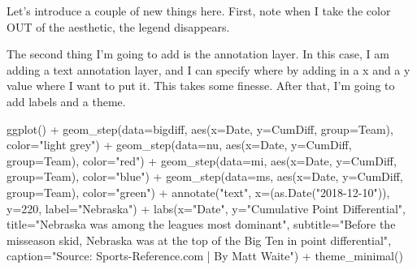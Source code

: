 \documentclass[
]{book}
\newenvironment{Shaded}{\begin{snugshade}}{\end{snugshade}}
\newcommand{\AttributeTok}[1]{\textcolor[rgb]{0.77,0.63,0.00}{#1}}
\newcommand{\DecValTok}[1]{\textcolor[rgb]{0.00,0.00,0.81}{#1}}
\newcommand{\FunctionTok}[1]{\textcolor[rgb]{0.00,0.00,0.00}{#1}}
\newcommand{\NormalTok}[1]{#1}
\newcommand{\SpecialCharTok}[1]{\textcolor[rgb]{0.00,0.00,0.00}{#1}}
\newcommand{\StringTok}[1]{\textcolor[rgb]{0.31,0.60,0.02}{#1}}
\begin{document}
Let's introduce a couple of new things here. First, note when I take the color OUT of the aesthetic, the legend disappears.

The second thing I'm going to add is the annotation layer. In this case, I am adding a text annotation layer, and I can specify where by adding in a x and a y value where I want to put it. This takes some finesse. After that, I'm going to add labels and a theme.

\begin{Shaded}
\begin{Highlighting}[]
\FunctionTok{ggplot}\NormalTok{() }\SpecialCharTok{+} 
  \FunctionTok{geom\_step}\NormalTok{(}\AttributeTok{data=}\NormalTok{bigdiff, }\FunctionTok{aes}\NormalTok{(}\AttributeTok{x=}\NormalTok{Date, }\AttributeTok{y=}\NormalTok{CumDiff, }\AttributeTok{group=}\NormalTok{Team), }\AttributeTok{color=}\StringTok{"light grey"}\NormalTok{) }\SpecialCharTok{+}
  \FunctionTok{geom\_step}\NormalTok{(}\AttributeTok{data=}\NormalTok{nu, }\FunctionTok{aes}\NormalTok{(}\AttributeTok{x=}\NormalTok{Date, }\AttributeTok{y=}\NormalTok{CumDiff, }\AttributeTok{group=}\NormalTok{Team), }\AttributeTok{color=}\StringTok{"red"}\NormalTok{) }\SpecialCharTok{+} 
  \FunctionTok{geom\_step}\NormalTok{(}\AttributeTok{data=}\NormalTok{mi, }\FunctionTok{aes}\NormalTok{(}\AttributeTok{x=}\NormalTok{Date, }\AttributeTok{y=}\NormalTok{CumDiff, }\AttributeTok{group=}\NormalTok{Team), }\AttributeTok{color=}\StringTok{"blue"}\NormalTok{) }\SpecialCharTok{+} 
  \FunctionTok{geom\_step}\NormalTok{(}\AttributeTok{data=}\NormalTok{ms, }\FunctionTok{aes}\NormalTok{(}\AttributeTok{x=}\NormalTok{Date, }\AttributeTok{y=}\NormalTok{CumDiff, }\AttributeTok{group=}\NormalTok{Team), }\AttributeTok{color=}\StringTok{"green"}\NormalTok{) }\SpecialCharTok{+}
  \FunctionTok{annotate}\NormalTok{(}\StringTok{"text"}\NormalTok{, }\AttributeTok{x=}\NormalTok{(}\FunctionTok{as.Date}\NormalTok{(}\StringTok{"2018{-}12{-}10"}\NormalTok{)), }\AttributeTok{y=}\DecValTok{220}\NormalTok{, }\AttributeTok{label=}\StringTok{"Nebraska"}\NormalTok{) }\SpecialCharTok{+}
  \FunctionTok{labs}\NormalTok{(}\AttributeTok{x=}\StringTok{"Date"}\NormalTok{, }\AttributeTok{y=}\StringTok{"Cumulative Point Differential"}\NormalTok{, }\AttributeTok{title=}\StringTok{"Nebraska was among the league\textquotesingle{}s most dominant"}\NormalTok{, }\AttributeTok{subtitle=}\StringTok{"Before the misseason skid, Nebraska was at the top of the Big Ten in point differential"}\NormalTok{, }\AttributeTok{caption=}\StringTok{"Source: Sports{-}Reference.com | By Matt Waite"}\NormalTok{) }\SpecialCharTok{+}
  \FunctionTok{theme\_minimal}\NormalTok{()}
\end{Highlighting}
\end{Shaded}
\end{document}

